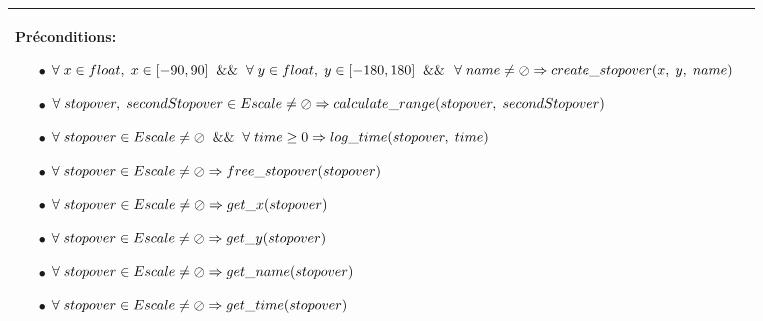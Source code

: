 \documentclass[a4paper, 11pt, oneside]{article}
\begin{document}
\begin{tabular}{|p{17cm}|c}
			\textbf{Préconditions:}
				\begin{itemize}
					\item[$\bullet$] $\forall \hspace{1mm} x \in float, \hspace{1mm} x \in [-90,90] \hspace{2mm} \&\& \hspace{2mm} \forall \hspace{1mm} y \in float, \hspace{1mm} y \in [-180,180]  \hspace{2mm} \&\&$ \newline $\forall \hspace{1mm} name \neq \oslash \Rightarrow create\_stopover(x, \hspace{1mm} y, \hspace{1mm} name)$
					\item[$\bullet$] $\forall \hspace{1mm} stopover, \hspace{1mm} secondStopover \in Escale \neq \oslash \Rightarrow calculate\_range(stopover, \hspace{1mm} secondStopover)$
					\item[$\bullet$] $\forall \hspace{1mm} stopover \in Escale \neq \oslash \hspace{2mm} \&\& \hspace{2mm} \forall \hspace{1mm} time \geq 0 \Rightarrow log\_time(stopover, \hspace{1mm} time) $
					\item[$\bullet$] $\forall \hspace{1mm} stopover \in Escale \neq \oslash \Rightarrow free\_stopover(stopover)$ 
					\item[$\bullet$] $\forall \hspace{1mm} stopover \in Escale \neq \oslash \Rightarrow get\_x(stopover)$ 
					\item[$\bullet$] $\forall \hspace{1mm} stopover \in Escale \neq \oslash \Rightarrow get\_y(stopover)$ 
					\item[$\bullet$] $\forall \hspace{1mm} stopover \in Escale \neq \oslash \Rightarrow get\_name(stopover)$ 
					\item[$\bullet$] $\forall \hspace{1mm} stopover \in Escale \neq \oslash \Rightarrow get\_time(stopover)$ 
				\end{itemize}
				
			\\	
			\hline
		\end{tabular}
		
		\footnotetext{\textcolor{red}{Nom des opérations interne}} 
		\footnotetext{\textcolor{green}{Arguments}} 
		\footnotetext{\textcolor{blue}{Types de retour}} 
		\footnotetext{\textcolor{magenta}{Nom des opérations d'observation}} 
	
\end{document}
